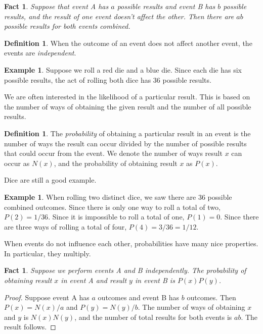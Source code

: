 \documentclass{book}
\theoremstyle{plain}
\newtheorem{fact}[theorem]{Fact}
\theoremstyle{definition}
\newtheorem{definition}[theorem]{Definition}
\newtheorem{example}[theorem]{Example}
\begin{document}
\begin{fact}
Suppose that event A has $a$ possible results and event B has $b$ possible results, and the result of one event doesn't affect the other. Then there are $ab$ possible results for both events combined.
\end{fact}

\begin{definition}
When the outcome of an event does not affect another event, the events are {\it independent}.
\end{definition}

\begin{example}
Suppose we roll a red die and a blue die. Since each die has six possible results, the act of rolling both dice has 36 possible results.
\end{example}

We are often interested in the likelihood of a particular result. This is based on the number of ways of obtaining the given result and the number of all possible results.

\begin{definition}
The {\it probability} of obtaining a particular result in an event is the number of ways the result can occur divided by the number of possible results that could occur from the event. We denote the number of ways result $x$ can occur as $N(x)$, and the probability of obtaining result $x$ as $P(x)$.
\end{definition}

Dice are still a good example.

\begin{example}
When rolling two distinct dice, we saw there are 36 possible combined outcomes. Since there is only one way to roll a total of two, $P(2) = 1/36$. Since it is impossible to roll a total of one, $P(1) = 0$. Since there are three ways of rolling a total of four, $P(4) = 3/36 = 1/12$.
\end{example}

When events do not influence each other, probabilities have many nice properties. In particular, they multiply.

\begin{fact}
Suppose we perform events A and B independently. The probability of obtaining result $x$ in event A and result $y$ in event B is $P(x)P(y)$.
\end{fact}

\begin{proof}
Suppose event A has $a$ outcomes and event B has $b$ outcomes. Then $P(x) = N(x)/a$ and $P(y) = N(y)/b$. The number of ways of obtaining $x$ and $y$ is $N(x)N(y)$, and the number of total results for both events is $ab$. The result follows.
\end{proof}
\end{document}
